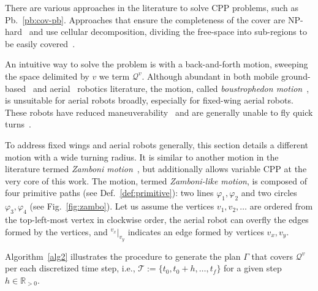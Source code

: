 \documentclass[letterpaper,10pt,journal,twoside]{IEEEtran}
\theoremstyle{definition}
\begin{document}
There are various approaches in the literature to solve CPP problems, such as Pb.~\ref{pb:cov-pb}. Approaches that ensure the completeness of the cover are NP-hard~\cite{arkin2000approximation} and use cellular decomposition, dividing the free-space into sub-regions to be easily covered~\cite{choset2001coverage,galceran2013survey}.

An intuitive way to solve the problem is with a back-and-forth motion, sweeping the space delimited by $v$ we term $\mathcal{Q}^v$. Although abundant in both mobile ground-based~\cite{choset2001coverage,choset2005principles,lavalle2006planning} and aerial~\cite{araujo2013multiple,artemenko2016energy,cabreira2018energy,difranco2015energy} robotics literature, the motion, called \emph{boustrophedon motion}~\cite{choset2001coverage}, is unsuitable for aerial robots broadly, especially for fixed-wing aerial robots. These robots have reduced maneuverability~\cite{dille2013efficient,mannadiar2010optimal,xu2011optimal,xu2014efficient} and are generally unable to fly quick turns~\cite{wang2017curvature}.

To address fixed wings and aerial robots generally, this section details a different motion with a wide turning radius. It is similar to another motion in the literature termed \emph{Zamboni motion}~\cite{araujo2013multiple},
but additionally allows variable CPP at the very core of this work. The motion, termed \emph{Zamboni-like motion}, is composed of four primitive paths (see Def.~\ref{def:primitive}): two lines $\varphi_1,\varphi_2$ and two circles $\varphi_3,\varphi_4$ (see Fig.~\ref{fig:zambo}). Let us assume the vertices $v_1,v_2,\dots$ are ordered from the top-left-most vertex in clockwise order, the aerial robot can overfly the edges formed by the vertices, and ${}^{v_x}|_{v_y}$ indicates an edge formed by vertices $v_x,v_y$. 

Algorithm~\ref{alg2} illustrates the procedure to generate the plan $\Gamma$ that covers $\mathcal{Q}^v$ per each discretized time step, i.e., $\mathcal{T}:=\{t_0,t_0+h,\dots,t_f\}$ for a given step $h\in\mathbb{R}_{>0}$.

\end{document}
